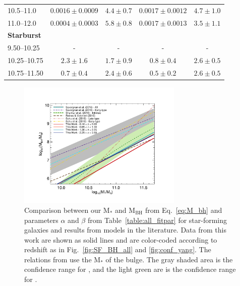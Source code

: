 \begin{table}
\begin{tabular}{l | c c | c c }
10.5--11.0                  & $ 0.0016 \pm 0.0009 $ & $ 4.4 \pm 0.7 $ & $0.0017 \pm 0.0012$ & $ 4.7 \pm 1.0 $ \\
11.0--12.0                  & $ 0.0004 \pm 0.0003 $ & $ 5.8 \pm 0.8 $ & $0.0017 \pm 0.0013$ & $ 3.5 \pm 1.1 $ \\
\hline                      
\textbf{Starburst}          &                       &                 &                     &                 \\
 9.50--10.25                & -                     & -               & -                   & -               \\
10.25--10.75                & $ 2.3   \pm 1.6 $     & $ 1.7 \pm 0.9 $ & $ 0.8  \pm 0.4 $    & $ 2.6 \pm 0.5 $ \\
10.75--11.50                & $ 0.7   \pm 0.4 $     & $ 2.4 \pm 0.6 $ & $ 0.5  \pm 0.2 $    & $ 2.6 \pm 0.5 $ \\
\hline
\end{tabular}
\end{table}
   
   \begin{figure}
   \centering
   \includegraphics[trim={2cm 1.5cm 3cm 2cm}, clip, width=0.7\textwidth]{Figs/Chapter2/reFigureForSection7.pdf}
      \caption{ Comparison between our M$_*$ and M$_\text{BH}$ from Eq.~\ref{eq:M_bh} and parameters $\alpha$ and $\beta$ from Table~\ref{table:all_fitpar} for star-forming galaxies and results from models in the literature. Data from this work are shown as solid lines and are color-coded according to redshift as in Fig.~\ref{fig:SF_BH_all} and \ref{fig:conf_yang}.
      The relations from \citet{2016ApJS..222...10S} use the M$_*$ of the bulge.
      The gray shaded area is the confidence range for \citet{2016ApJS..222...10S}, and the light green are is the confidence range for \citet{2016MNRAS.460.3119S}.
              }
         \label{fig:comp_models}
   \end{figure}

